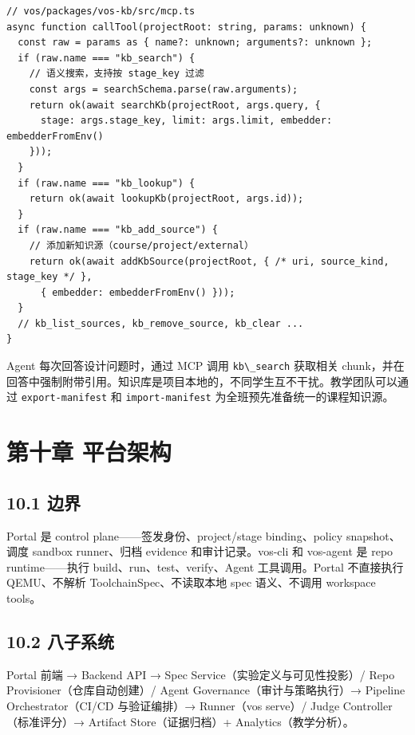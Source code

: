 \documentclass[UTF8,a4paper,12pt,openany]{ctexrep}
\newcommand{\passthrough}[1]{#1}
\begin{document}
\begin{lstlisting}
// vos/packages/vos-kb/src/mcp.ts
async function callTool(projectRoot: string, params: unknown) {
  const raw = params as { name?: unknown; arguments?: unknown };
  if (raw.name === "kb_search") {
    // 语义搜索，支持按 stage_key 过滤
    const args = searchSchema.parse(raw.arguments);
    return ok(await searchKb(projectRoot, args.query, {
      stage: args.stage_key, limit: args.limit, embedder: embedderFromEnv()
    }));
  }
  if (raw.name === "kb_lookup") {
    return ok(await lookupKb(projectRoot, args.id));
  }
  if (raw.name === "kb_add_source") {
    // 添加新知识源（course/project/external）
    return ok(await addKbSource(projectRoot, { /* uri, source_kind, stage_key */ },
      { embedder: embedderFromEnv() }));
  }
  // kb_list_sources, kb_remove_source, kb_clear ...
}
\end{lstlisting}

Agent 每次回答设计问题时，通过 MCP 调用 \passthrough{\lstinline!kb\_search!} 获取相关 chunk，并在回答中强制附带引用。知识库是项目本地的，不同学生互不干扰。教学团队可以通过 \passthrough{\lstinline!export-manifest!} 和 \passthrough{\lstinline!import-manifest!} 为全班预先准备统一的课程知识源。


\chapter{第十章 平台架构}\label{ux7b2cux5341ux7ae0-ux5e73ux53f0ux67b6ux6784}

\section{10.1 边界}\label{101-ux8fb9ux754c}

Portal 是 control plane------签发身份、project/stage binding、policy snapshot、调度 sandbox runner、归档 evidence 和审计记录。vos-cli 和 vos-agent 是 repo runtime------执行 build、run、test、verify、Agent 工具调用。Portal 不直接执行 QEMU、不解析 ToolchainSpec、不读取本地 spec 语义、不调用 workspace tools。

\section{10.2 八子系统}\label{102-ux516bux5b50ux7cfbux7edf}

Portal 前端 → Backend API → Spec Service（实验定义与可见性投影）/ Repo Provisioner（仓库自动创建）/ Agent Governance（审计与策略执行）→ Pipeline Orchestrator（CI/CD 与验证编排）→ Runner（vos serve）/ Judge Controller（标准评分）→ Artifact Store（证据归档）+ Analytics（教学分析）。
\end{document}
